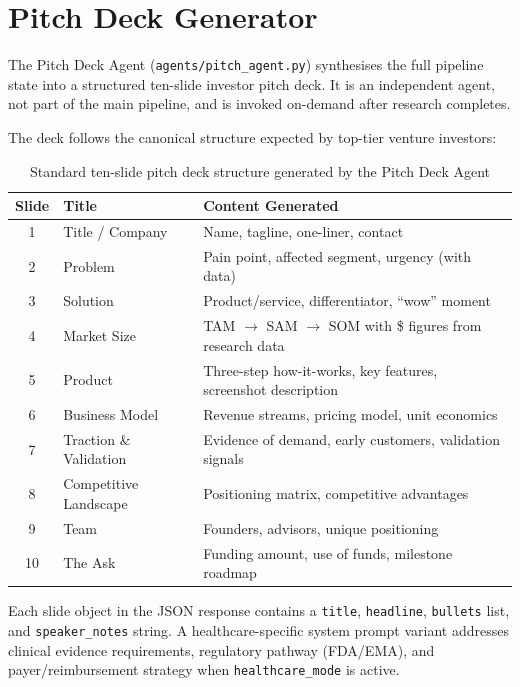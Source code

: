 \documentclass[12pt,a4paper,oneside]{book}
\begin{document}
\section{Pitch Deck Generator}
\label{sec:pitch_deck}

The Pitch Deck Agent (\texttt{agents/pitch\_agent.py}) synthesises the full
pipeline state into a structured ten-slide investor pitch deck. It is an
independent agent, not part of the main pipeline, and is invoked on-demand
after research completes.

The deck follows the canonical structure expected by top-tier venture investors:

\begin{table}[H]
\centering
\caption{Standard ten-slide pitch deck structure generated by the Pitch Deck Agent}
\label{tab:pitch_slides}
\begin{tabularx}{\textwidth}{clX}
\toprule
\textbf{Slide} & \textbf{Title} & \textbf{Content Generated} \\
\midrule
1  & Title / Company       & Name, tagline, one-liner, contact \\
2  & Problem               & Pain point, affected segment, urgency (with data) \\
3  & Solution              & Product/service, differentiator, ``wow'' moment \\
4  & Market Size           & TAM $\to$ SAM $\to$ SOM with \$ figures from research data \\
5  & Product               & Three-step how-it-works, key features, screenshot description \\
6  & Business Model        & Revenue streams, pricing model, unit economics \\
7  & Traction \& Validation & Evidence of demand, early customers, validation signals \\
8  & Competitive Landscape & Positioning matrix, competitive advantages \\
9  & Team                  & Founders, advisors, unique positioning \\
10 & The Ask               & Funding amount, use of funds, milestone roadmap \\
\bottomrule
\end{tabularx}
\end{table}

Each slide object in the JSON response contains a \texttt{title}, \texttt{headline},
\texttt{bullets} list, and \texttt{speaker\_notes} string. A healthcare-specific system
prompt variant addresses clinical evidence requirements, regulatory pathway (FDA/EMA),
and payer/reimbursement strategy when \texttt{healthcare\_mode} is active.
\end{document}
